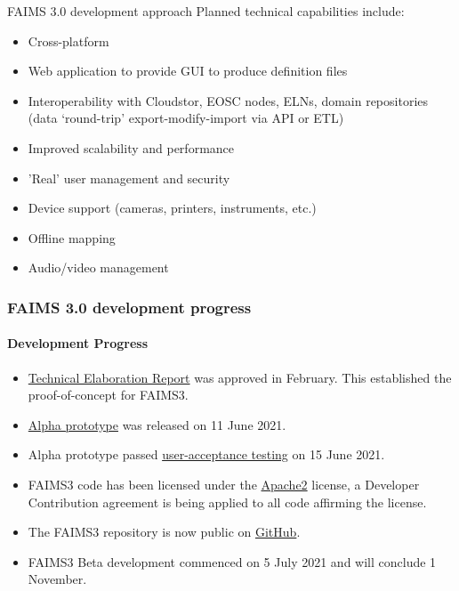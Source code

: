 \documentclass[
	aspectratio=169, %
	12pt, %
	t, %
]{beamer}
\begin{document}
\begin{refsegment}
\begin{sectionframe}
\end{sectionframe}



\begin{frame}{FAIMS 3.0 development approach}
Planned technical capabilities include:
    \begin{itemize}
        \item Cross-platform
        \item Web application to provide GUI to produce definition files
        \item Interoperability with Cloudstor, EOSC nodes, ELNs, domain repositories (data `round-trip' export-modify-import via API or ETL)
        \item Improved scalability and performance
        \item 'Real' user management and security
        \item Device support (cameras, printers, instruments, etc.)
        \item Offline mapping
        \item Audio/video management
    \end{itemize}
\end{frame}


\begin{frame}
    \frametitle{FAIMS 3.0 development progress}
    \framesubtitle{Development Progress}        
        \begin{itemize}
            \item \href{https://docs.google.com/document/d/13eTN8jhJa3Pgs9GOdo7r4jtIQcskNo7ikxJcBDBKHzw/edit}{Technical Elaboration Report} was approved in February. This established the proof-of-concept for FAIMS3. 
          \item \href{https://github.com/FAIMS/FAIMS3/releases/tag/v0.1.0-alpha}{Alpha prototype} was released on 11 June 2021.  
          \item Alpha prototype passed \href{https://doi.org/10.5281/zenodo.5030772}{user-acceptance testing} on 15 June 2021.
        \item FAIMS3 code has been licensed under the \href{https://www.apache.org/licenses/LICENSE-2.0}{Apache2} license, a Developer Contribution agreement is being applied to all code affirming the license. 
        \item The FAIMS3 repository is now public on \href{https://github.com/FAIMS/FAIMS3}{GitHub}.
        \item FAIMS3 Beta development commenced on 5 July 2021 and will conclude 1 November. 


\end{itemize}
\end{frame}
\end{refsegment}
\end{document}
